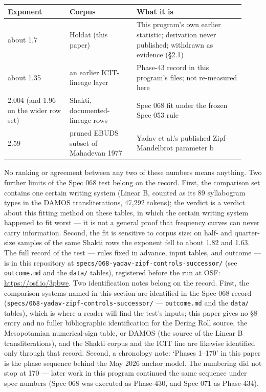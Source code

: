 \documentclass[
]{article}
\begin{document}
\begin{center}
\begin{tabular}{@{}p{0.24\linewidth} p{0.26\linewidth} p{0.42\linewidth}@{}}
\toprule
Exponent & Corpus & What it is \\
\midrule
about 1.7 & Holdat (this paper) & This program's own earlier statistic; derivation never published; withdrawn as evidence (§2.1) \\
about 1.35 & an earlier ICIT-lineage layer & Phase-43 record in this program's files; not re-measured here \\
2.004 (and 1.96 on the wider row set) & Shakti, documented-lineage rows & Spec 068 fit under the frozen Spec 053 rule \\
2.59 & pruned EBUDS subset of Mahadevan 1977 & Yadav et al.'s published Zipf--Mandelbrot parameter b \\
\bottomrule
\end{tabular}
\end{center}

No ranking or agreement between any two of these numbers means anything. Two further limits of the Spec 068 test belong on the record. First, the comparison set contains one certain writing system (Linear B, counted as its 89 syllabogram types in the DAMOS transliterations, 47,292 tokens); the verdict is a verdict about this fitting method on these tables, in which the certain writing system happened to fit worst --- it is not a general proof that frequency curves can never carry information. Second, the fit is sensitive to corpus size: on half- and quarter-size samples of the same Shakti rows the exponent fell to about 1.82 and 1.63. The full record of the test --- rules fixed in advance, input tables, and outcome --- is in this repository at \texttt{specs/068-yadav-zipf-controls-successor/} (see \texttt{outcome.md} and the \texttt{data/} tables), registered before the run at OSF: \url{https://osf.io/3pbwe}. Two identification notes belong on the record. First, the comparison systems named in this section are identified in the Spec 068 record (\texttt{specs/068-yadav-zipf-controls-successor/} --- \texttt{outcome.md} and the \texttt{data/} tables), which is where a reader will find the test's inputs; this paper gives no §8 entry and no fuller bibliographic identification for the Dering Roll source, the Mesopotamian numerical-sign table, or DAMOS (the source of the Linear B transliterations), and the Shakti corpus and the ICIT line are likewise identified only through that record. Second, a chronology note: `Phases 1--170' in this paper is the phase sequence behind the May 2026 anchor model. The numbering did not stop at 170 --- later work in this program continued the same sequence under spec numbers (Spec 068 was executed as Phase-430, and Spec 071 as Phase-434).
\end{document}
